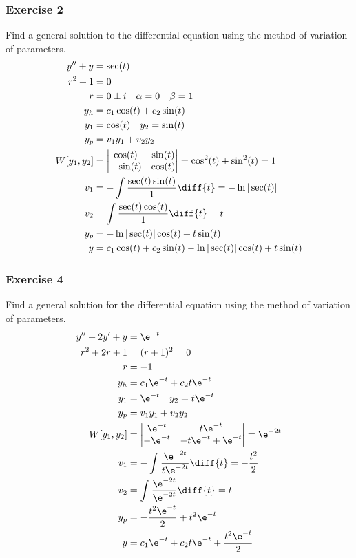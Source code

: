 \documentclass{math}
\begin{document}
\subsubsection*{Exercise 2}
Find a general solution to the differential equation using the method of
variation of parameters.
\begin{align*}
  y''+y &= \sec(t) \\
  r^2+1 &= 0 \\
  r &= 0\pm i \quad \alpha = 0 \quad \beta = 1 \\
  y_h &= c_1\cos(t)+c_2\sin(t) \\
  y_1 &= \cos(t) \quad y_2 = \sin(t) \\
  y_p &= v_1y_1+v_2y_2 \\
  W[y_1,y_2] &= \begin{vmatrix}
    \cos(t) & \sin(t) \\
    -\sin(t) & \cos(t)
  \end{vmatrix} = \cos^2(t)+\sin^2(t) = 1 \\
  v_1 &= -\int\frac{\sec(t)\sin(t)}{1}\diff{t} = -\ln|\sec(t)| \\
  v_2 &= \int\frac{\sec(t)\cos(t)}{1}\diff{t} = t \\
  y_p &= -\ln|\sec(t)|\cos(t)+t\sin(t) \\
  y &= c_1\cos(t)+c_2\sin(t)-\ln|\sec(t)|\cos(t)+t\sin(t)
\end{align*}

\subsubsection*{Exercise 4}
Find a general solution for the differential equation using the method of
variation of parameters.
\begin{align*}
  y''+2y'+y &= \e^{-t} \\
  r^2+2r+1 &= (r+1)^2 = 0 \\
  r &= -1 \\
  y_h &= c_1\e^{-t}+c_2t\e^{-t} \\
  y_1 &= \e^{-t} \quad y_2 = t\e^{-t} \\
  y_p &= v_1y_1+v_2y_2 \\
  W[y_1,y_2] &= \begin{vmatrix}
    \e^{-t} & t\e^{-t} \\
    -\e^{-t} & -t\e^{-t}+\e^{-t}
  \end{vmatrix} = \e^{-2t} \\
  v_1 &= -\int\frac{\e^{-2t}}{t\e^{-2t}}\diff{t} = -\frac{t^2}{2} \\
  v_2 &= \int\frac{\e^{-2t}}{\e^{-2t}}\diff{t} = t \\
  y_p &= -\frac{t^2\e^{-t}}{2}+t^2\e^{-t} \\
  y &= c_1\e^{-t}+c_2t\e^{-t}+\frac{t^2\e^{-t}}{2}
\end{align*}
\end{document}
